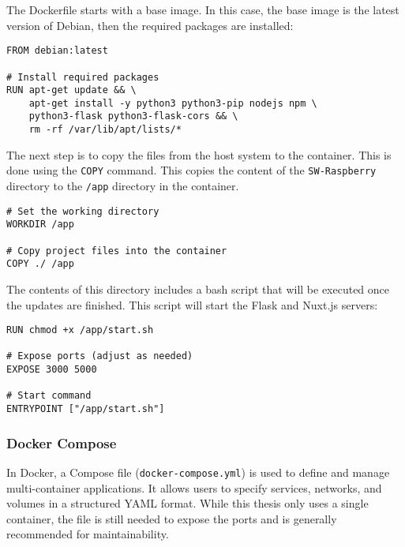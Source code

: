         The Dockerfile starts with a base image. In this case, the
        base image is the latest version of Debian, then the
        required packages are installed:

        \begin{verbatim}
FROM debian:latest

# Install required packages
RUN apt-get update && \
    apt-get install -y python3 python3-pip nodejs npm \
    python3-flask python3-flask-cors && \
    rm -rf /var/lib/apt/lists/*
        \end{verbatim}

        The next step is to copy the files from the host
        system to the container. This is done using the \texttt{COPY}
        command. This copies the content of the \texttt{SW-Raspberry} 
        directory to the \texttt{/app} directory in the container.

        \begin{verbatim}
# Set the working directory
WORKDIR /app

# Copy project files into the container
COPY ./ /app
        \end{verbatim}

        The contents of this directory includes a bash script
        that will be executed once the updates are finished. This
        script will start the Flask and Nuxt.js servers:

        \begin{verbatim}
RUN chmod +x /app/start.sh

# Expose ports (adjust as needed)
EXPOSE 3000 5000

# Start command 
ENTRYPOINT ["/app/start.sh"]
        \end{verbatim}

        \subsubsection{Docker Compose}
        In Docker, a Compose file (\texttt{docker-compose.yml}) is used to 
        define and manage multi-container applications. It allows 
        users to specify services, networks, and volumes in a 
        structured YAML format. While this thesis only uses a single
        container, the file is still needed to expose the ports and
        is generally recommended for maintainability.

